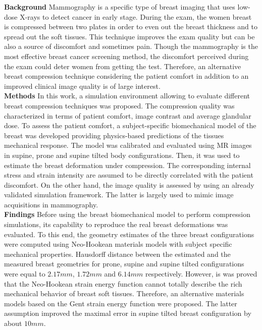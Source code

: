 \noindent
\textbf{Background} Mammography is a specific type of breast imaging that uses low-dose X-rays to detect cancer in early stage. During the exam, the women breast is compressed between two plates in order to even out the breast thickness and to spread out the soft tissues. This technique improves the exam quality but can be also a source of discomfort and sometimes pain. Though the mammography is the most effective breast cancer screening method, the discomfort perceived during the exam could deter women from getting the test. Therefore, an alternative breast compression technique considering the patient comfort in addition to an improved clinical image quality is of large interest. \\

\noindent
\textbf{Methods}
In this work, a simulation environment allowing to evaluate different breast compression techniques was proposed. The compression quality was characterized in terms of patient comfort, image contrast and average glandular dose. To assess the patient comfort, a subject-specific biomechanical model of the breast was developed providing physics-based predictions of the tissues mechanical response. The model was calibrated and evaluated using MR images in supine, prone and supine tilted body configurations. Then, it was used to estimate the breast deformation under compression.  The corresponding internal stress and strain intensity are assumed to be directly correlated with the patient discomfort. On the other hand, the image quality is assessed by using an already validated simulation framework. The latter is largely used to mimic image acquisitions in mammography. \\


\noindent
\textbf{Findings} Before using the breast biomechanical model to perform compression simulations, its capability to reproduce the real breast deformations was evaluated. To this end, the geometry estimates of the three breast configurations were computed using Neo-Hookean materials models with subject specific mechanical properties. Hausdorff distance between the estimated and the measured breast geometries for prone, supine and supine tilted configurations were equal to $ 2.17 mm$, $1.72 mm$ and $6.14 mm$ respectively. However, is was proved that the Neo-Hookean strain energy function cannot totally describe the rich mechanical behavior of breast soft tissues. Therefore, an alternative materials models based on the Gent strain energy function were proposed. The latter assumption improved the maximal error in supine tilted breast configuration by about $10mm$. \\

